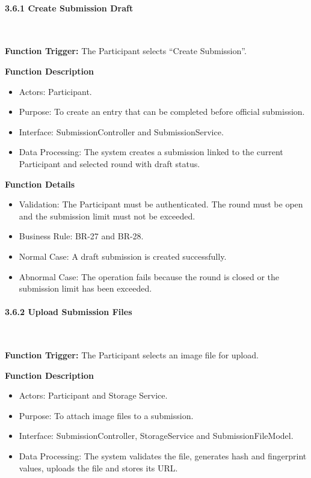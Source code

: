 \paragraph*{3.6.1 Create Submission Draft}\leavevmode\\[-0.5em]
\label{par:create-submission-draft}

\textbf{Function Trigger:} The Participant selects ``Create Submission''.

\textbf{Function Description}
\begin{itemize}[leftmargin=1.5em, nosep]
    \item Actors: Participant.
    \item Purpose: To create an entry that can be completed before official submission.
    \item Interface: SubmissionController and SubmissionService.
    \item Data Processing: The system creates a submission linked to the current Participant and selected round with draft status.
\end{itemize}

\textbf{Function Details}
\begin{itemize}[leftmargin=1.5em, nosep]
    \item Validation: The Participant must be authenticated. The round must be open and the submission limit must not be exceeded.
    \item Business Rule: BR-27 and BR-28.
    \item Normal Case: A draft submission is created successfully.
    \item Abnormal Case: The operation fails because the round is closed or the submission limit has been exceeded.
\end{itemize}

\paragraph*{3.6.2 Upload Submission Files}\leavevmode\\[-0.5em]
\label{par:upload-submission-files}

\textbf{Function Trigger:} The Participant selects an image file for upload.

\textbf{Function Description}
\begin{itemize}[leftmargin=1.5em, nosep]
    \item Actors: Participant and Storage Service.
    \item Purpose: To attach image files to a submission.
    \item Interface: SubmissionController, StorageService and SubmissionFileModel.
    \item Data Processing: The system validates the file, generates hash and fingerprint values, uploads the file and stores its URL.
\end{itemize}


